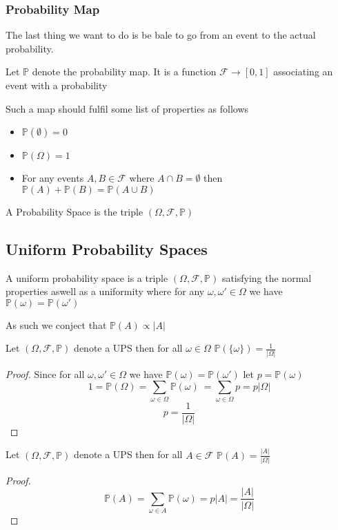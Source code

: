 \documentclass{article}
\begin{document}
\subsubsection{Probability Map}
The last thing we want to do is be bale to go from an event to the actual probability.
\begin{definition}
    Let $\mathbb{P}$ denote the probability map. It is a function $\mathcal{F} \to [0,1]$ associating an event with a probability
\end{definition}
Such a map should fulfil some list of properties as follows
\begin{itemize}
    \item $\mathbb{P}({\emptyset}) = 0$
    \item $\mathbb{P}(\Omega) = 1$
    \item For any events $A,B \in \mathcal{F}$ where $A \cap B = \emptyset $ then $\mathbb{P}(A) + \mathbb{P}(B) = \mathbb{P}(A \cup B)$
\end{itemize}



\begin{definition}
    A Probability Space is the triple $(\Omega,\mathcal{F},\mathbb{P})$
\end{definition}
\subsection{Uniform Probability Spaces}
\begin{definition}
    A uniform probability space is a triple $(\Omega,\mathcal{F},\mathbb{P})$  satisfying the normal properties aswell as a uniformity where for any $\omega,\omega' \in \Omega$ we have $\mathbb{P}(\omega) = \mathbb{P}(\omega')$
\end{definition}
As such we conject that $\mathbb{P}(A) \propto |A|$
\begin{proposition}
    Let $(\Omega,\mathcal{F},\mathbb{P})$ denote a UPS then for all $\omega \in \Omega$ $\mathbb{P}(\{\omega\}) = \frac{1}{|\Omega|}$ 
\end{proposition}
\begin{proof}
    Since for all $\omega,\omega' \in \Omega$ we have $\mathbb{P}(\omega) = \mathbb{P}(\omega')$  let $p = \mathbb{P}(\omega)$
    \[1 = \mathbb{P}(\Omega) = \sum_{\omega \in \Omega}\mathbb{P}(\omega)\ = \sum_{\omega \in \Omega}p = p|\Omega|\]
    \[p = \frac{1}{|\Omega|}\]
\end{proof}
\begin{proposition}
    Let $(\Omega,\mathcal{F},\mathbb{P})$ denote a UPS then for all $A \in \mathcal{F}$ $\mathbb{P}(A) = \frac{|A|}{|\Omega|}$ 
\end{proposition}
\begin{proof}
    \[\mathbb{P}(A) =  \sum_{\omega \in A}\mathbb{P}(\omega) = p|A| = \frac{|A|}{|\Omega|}\]
\end{proof}
\end{document}
